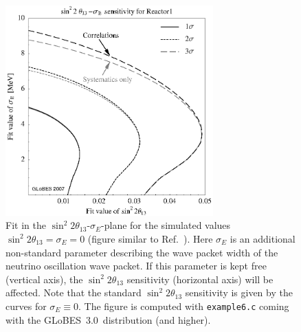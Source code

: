 \documentclass[12pt,a4paper]{article}
\newcommand{\capdef}{}
\newcommand{\mycaption}[2][\capdef]{\renewcommand{\capdef}{#2}%
       \caption[#1]{{\footnotesize #2}}}
\newcommand{\Ref}{Ref.}
\newcommand{\stheta}{\sin^2 2 \theta_{13}}
\newcommand{\GLOBESN}{{\sf GLoBES~3.0}}
\begin{document}
\begin{figure}[t]
\begin{center}
\includegraphics[width=8cm]{reactorNSI}
\end{center}
\mycaption{\label{fig:reactorNSI} Fit in the $\stheta$-$\sigma_E$-plane for the simulated values
$\stheta=\sigma_E=0$ (figure similar to \Ref~\cite{Blennow:2005yk}). Here $\sigma_E$ is an additional non-standard parameter describing the wave packet width of the neutrino oscillation wave packet. If this parameter is
kept free (vertical axis), the $\stheta$ sensitivity (horizontal axis) will be affected. Note that
the standard $\stheta$ sensitivity is given by the curves for $\sigma_E \equiv 0$.
The figure is computed with
{\tt example6.c} coming with the \GLOBESN\ distribution (and higher).}
\end{figure}
\end{document}
